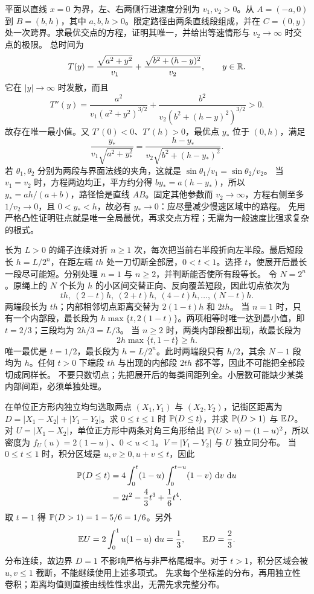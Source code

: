 平面以直线 $x=0$ 为界，左、右两侧行进速度分别为 $v_1,v_2>0$。从 $A=(-a,0)$ 到 $B=(b,h)$，其中 $a,b,h>0$。限定路径由两条直线段组成，并在 $C=(0,y)$ 处一次跨界。求最优交点的方程，证明其唯一，并给出等速情形与 $v_2\to\infty$ 时交点的极限。
\solution 总时间为
\[
 T(y)=\frac{\sqrt{a^2+y^2}}{v_1}
      +\frac{\sqrt{b^2+(h-y)^2}}{v_2},\qquad y\in\mathbb{R}.
\]
它在 $|y|\to\infty$ 时发散，而且
\[
 T''(y)=\frac{a^2}{v_1(a^2+y^2)^{3/2}}
 +\frac{b^2}{v_2(b^2+(h-y)^2)^{3/2}}>0.
\]
故存在唯一最小值。又 $T'(0)<0$、$T'(h)>0$，最优点 $y_*$ 位于 $(0,h)$，满足
\[
 \boxed{\frac{y_*}{v_1\sqrt{a^2+y_*^2}}
 =\frac{h-y_*}{v_2\sqrt{b^2+(h-y_*)^2}}}.
\]
若 $\theta_1,\theta_2$ 分别为两段与界面法线的夹角，这就是 $\sin\theta_1/v_1=\sin\theta_2/v_2$。
当 $v_1=v_2$ 时，方程两边均正，平方约分得 $by_*=a(h-y_*)$，所以 $y_*=ah/(a+b)$，路径恰是直线 $AB$。固定其他参数而 $v_2\to\infty$，方程右侧至多 $1/v_2\to0$，且 $0<y_*<h$，故必有 $y_*\to0$：应尽量减少慢速区域中的路程。
\insight 先用严格凸性证明驻点就是唯一全局最优，再求交点方程；无需为一般速度比强求复杂的根式。

长为 $L>0$ 的绳子连续对折 $n\ge1$ 次，每次把当前右半段折向左半段。最后短段长 $h=L/2^n$，在距左端 $th$ 处一刀切断全部层，$0<t<1$。选择 $t$，使展开后最长一段尽可能短。分别处理 $n=1$ 与 $n\ge2$，并判断能否使所有段等长。
\solution 令 $N=2^n$。原绳上的 $N$ 个长为 $h$ 的小区间交替正向、反向覆盖短段，因此切点依次为
\[
 th,\ (2-t)h,\ (2+t)h,\ (4-t)h,\ldots,(N-t)h.
\]
两端段长为 $th$；内部相邻切点距离交替为 $2(1-t)h$ 和 $2th$。
当 $n=1$ 时，只有一个内部段，最长段为 $h\max\{t,2(1-t)\}$。两项相等时唯一达到最小值，即 $t=2/3$；三段均为 $2h/3=L/3$。
当 $n\ge2$ 时，两类内部段都出现，故最长段为
\[
 2h\max\{t,1-t\}\ge h.
\]
唯一最优是 $t=1/2$，最长段为 $h=L/2^n$。此时两端段只有 $h/2$，其余 $N-1$ 段均为 $h$。任何 $t>0$ 下端段 $th$ 与出现的内部段 $2th$ 都不等，因此不可能把全部段切成同样长。
\insight 不要只数切点；先把展开后的每类间距列全。小层数可能缺少某类内部间距，必须单独处理。

在单位正方形内独立均匀选取两点 $(X_1,Y_1)$ 与 $(X_2,Y_2)$，记街区距离为 $D=|X_1-X_2|+|Y_1-Y_2|$。求 $0\le t\le1$ 时 $\mathbb{P}(D\le t)$，并求 $\mathbb{P}(D>1)$ 与 $\mathbb{E} D$。
\solution 对 $U=|X_1-X_2|$，单位正方形中两条对角三角形给出 $\mathbb{P}(U>u)=(1-u)^2$，所以密度为 $f_U(u)=2(1-u)$、$0<u<1$。$V=|Y_1-Y_2|$ 与 $U$ 独立同分布。
当 $0\le t\le1$ 时，积分区域是 $u,v\ge0,u+v\le t$，因此
\[
 \begin{aligned}
 \mathbb{P}(D\le t)
 &=4\int_0^t(1-u)\int_0^{t-u}(1-v)\,\,\mathrm{d} v\,\,\mathrm{d} u\\
 &=2t^2-\frac43t^3+\frac16t^4.
 \end{aligned}
\]
取 $t=1$ 得 $\mathbb{P}(D>1)=1-5/6=1/6$。另外
\[
 \mathbb{E} U=2\int_0^1u(1-u)\,\,\mathrm{d} u=\frac13,
 \qquad\mathbb{E} D=\frac23.
\]
分布连续，故边界 $D=1$ 不影响严格与非严格尾概率。对于 $t>1$，积分区域会被 $u,v\le1$ 截断，不能继续使用上述多项式。
\insight 先求每个坐标差的分布，再用独立性卷积；距离均值则直接由线性性求出，无需先求完整分布。

